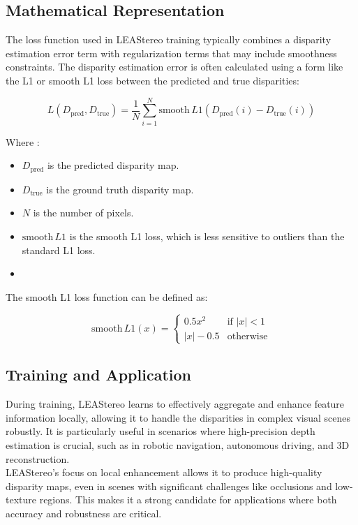 \documentclass[22pt]{report}
\begin{document}
\subsection{Mathematical Representation}
The loss function used in LEAStereo training typically combines a disparity estimation error term with regularization terms that may include smoothness constraints. The disparity estimation error is often calculated using a form like the L1 or smooth L1 loss between the predicted and true disparities:
\begin{center}
    \[
    L(D_{\text{pred}}, D_{\text{true}}) = \frac{1}{N} \sum_{i=1}^{N} \text{smooth} \, L1 \left( D_{\text{pred}}(i) - D_{\text{true}}(i) \right)
    \]
\end{center}
Where : 
\begin{itemize}
    \item \( D_{\text{pred}} \) is the predicted disparity map. 
    \item \( D_{\text{true}} \) is the ground truth disparity map. 
    \item \( N \) is the number of pixels. 
    \item \(\text{smooth} \, L1\) is the smooth L1 loss, which is less sensitive to outliers than the standard L1 loss.
    \item 
\end{itemize}
\vspace{7}
The smooth L1 loss function can be defined as:
\begin{center}
        \[
        \text{smooth} \, L1(x) =
        \begin{cases} 
        0.5 x^2 & \text{if } |x| < 1 \\
        |x| - 0.5 & \text{otherwise}
        \end{cases}
        \]
\end{center}    
\subsection{Training and Application}
During training, LEAStereo learns to effectively aggregate and enhance feature information locally, allowing it to handle the disparities in complex visual scenes robustly. It is particularly useful in scenarios where high-precision depth estimation is crucial, such as in robotic navigation, autonomous driving, and 3D reconstruction.\\
LEAStereo's focus on local enhancement allows it to produce high-quality disparity maps, even in scenes with significant challenges like occlusions and low-texture regions. This makes it a strong candidate for applications where both accuracy and robustness are critical.
\end{document}

